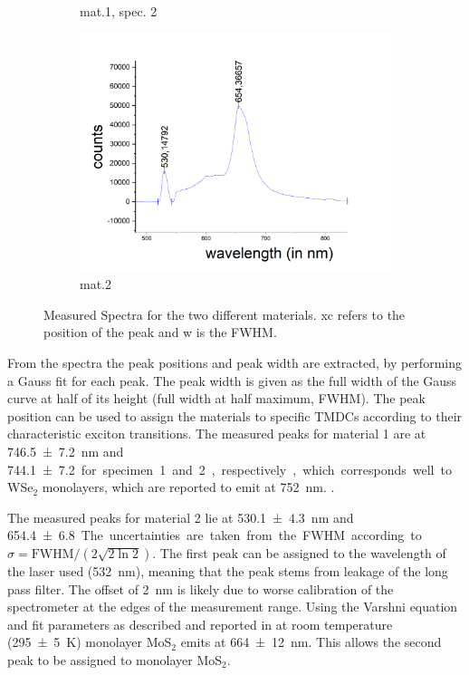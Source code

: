 \begin{figure}[H]
\begin{subfigure}{0.47\textwidth}
        \caption{mat.1, spec. 2}
	      \label{fig_mono_spec2_1dspec}
    \end{subfigure}
    \begin{subfigure}{0.6\textwidth}
        \centering
        \includegraphics[width=\textwidth]{img/output_t1/spekt_m2}
        \caption{mat.2}
	      \label{fig_mono_spec3_1dspec}
    \end{subfigure}
    \caption{Measured Spectra for the two different materials. xc refers to the position of the peak and w is the FWHM.}
	\label{fig_mono_1dspectra} %
\end{figure}

From the spectra the peak positions and peak width are extracted, by performing a Gauss fit for each peak.
The peak width is given as the full width of the Gauss curve at half of its height (full width at half maximum, FWHM).
The peak position can be used to assign the materials to specific TMDCs according to their characteristic exciton transitions.
The measured peaks for material 1 are at \SI{746,5\pm 7,2}{nm} and \SI{744,1 \pm 7,2} for specimen 1 and 2, respectively, which corresponds well to WSe$_2$ monolayers, which are reported to emit at \SI{752}{nm}. \cite{Tonndorf2013}.

The measured peaks for material 2 lie at \SI{530,1 \pm 4,3}{nm} and \SI{654,4 \pm 6,8}.
The uncertainties are taken from the FWHM according to $\sigma = \mathrm{FWHM}/(2\sqrt{2 \ln 2})$.
The first peak can be assigned to the wavelength of the laser used (\SI{532}{nm}), meaning that the peak stems from leakage of the long pass filter.
The offset of \SI{2}{nm} is likely due to worse calibration of the spectrometer at the edges of the measurement range.
Using the Varshni equation and fit parameters as described and reported in \cite{xu19} at room temperature (\SI{295 \pm 5}{K}) monolayer MoS$_2$ emits at \SI{664 \pm 12}{nm}.
This allows the second peak to be assigned to monolayer MoS$_2$.
